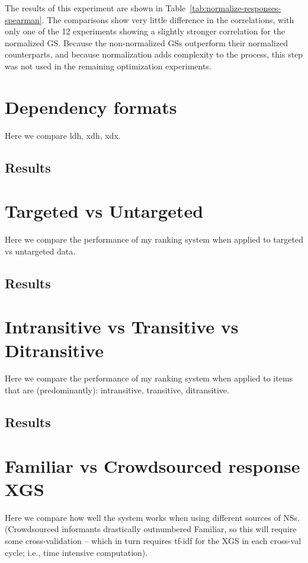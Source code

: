 The results of this experiment are shown in Table~\ref{tab:normalize-responses-spearman}. The comparisons show very little difference in the correlations, with only one of the 12 experiments showing a slightly stronger correlation for the normalized GS. Because the non-normalized GSs outperform their normalized counterparts, and because normalization adds complexity to the process, this step was not used in the remaining optimization experiments.

\section{Dependency formats}
\label{section:experiment-dependency-formats}
Here we compare ldh, xdh, xdx.
\subsection{Results}
\label{subsection:dependency-formats-results}

\section{Targeted vs Untargeted}
\label{section:experiment-targeted}
Here we compare the performance of my ranking system when applied to targeted vs untargeted data.
\subsection{Results}
\label{subsection:targeted-results}

\section{Intransitive vs Transitive vs Ditransitive}
\label{section:experiment-transitive}
Here we compare the performance of my ranking system when applied to items that are (predominantly): intransitive, transitive, ditransitive.
\subsection{Results}
\label{subsection:transitive-results}

\section{Familiar vs Crowdsourced response XGS}
\label{section:experiment-crowdsource}
Here we compare how well the system works when using different sources of NSs. (Crowdsourced informants drastically outnumbered Familiar, so this will require some cross-validation -- which in turn requires tf-idf for the XGS in each cross-val cycle; i.e., time intensive computation).
